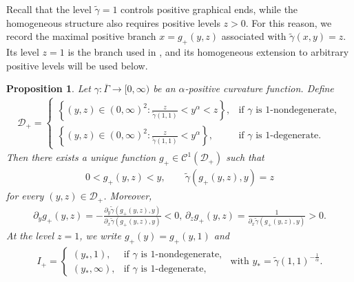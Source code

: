 \documentclass{amsart}
\theoremstyle{plain}
\newtheorem{proposition}[theorem]{Proposition}
\theoremstyle{mainintrothm}
\theoremstyle{definition}
\begin{document}
\medskip

Recall that the level $\widetilde\gamma=1$ controls positive graphical ends, while the homogeneous structure also requires positive levels $z>0$.  For this reason,
we record the maximal positive branch $x=g_+(y,z)$ associated with
$\widetilde\gamma(x,y)=z$.  Its level $z=1$ is the branch used in
\cite[Definition~6 and Section~2.3.2]{rengaswami2024classification}, and its
homogeneous extension to arbitrary positive levels will be used below.

\begin{proposition}
	\label{prop:positive-branch}
	Let $\gamma:\overline\Gamma\to[0,\infty)$ be an $\alpha$-positive
	curvature function.  Define
	\begin{align*}
		\mathcal D_+
		=
		\begin{cases}
			\left\{(y,z)\in(0,\infty)^2:
				\frac{z}{\widetilde\gamma(1,1)}<y^\alpha<z\right\},
			& \text{if $\gamma$ is $1$-nondegenerate},\\[6pt]
			\left\{(y,z)\in(0,\infty)^2:
				\frac{z}{\widetilde\gamma(1,1)}<y^\alpha\right\},
			& \text{if $\gamma$ is $1$-degenerate}.
		\end{cases}
	\end{align*}
	Then there exists a unique function
	$g_+\in\mathcal C^1(\mathcal D_+)$ such that
	\begin{align*}
		0<g_+(y,z)<y,
		\qquad
		\widetilde\gamma(g_+(y,z),y)=z
	\end{align*}
	for every $(y,z)\in\mathcal D_+$.  Moreover,
	\begin{align*}
		\partial_y g_+(y,z)
         =
		-\frac{\partial_y\widetilde\gamma(g_+(y,z),y)}
		{\partial_x\widetilde\gamma(g_+(y,z),y)}
		<0,\,
		\partial_z g_+(y,z)
		=
		\frac{1}
		{\partial_x\widetilde\gamma(g_+(y,z),y)}
		>0.
	\end{align*}
	At the level $z=1$, we write $g_+(y)=g_+(y,1)$ and
	\begin{align*}
		I_+
		=
		\begin{cases}
			(y_*,1), & \text{if $\gamma$ is $1$-nondegenerate},\\
			(y_*,\infty), & \text{if $\gamma$ is $1$-degenerate},
		\end{cases}
		\mbox{ with }
		y_*=\widetilde\gamma(1,1)^{-\frac{1}{\alpha}} .
	\end{align*}
\end{proposition}
\end{document}
